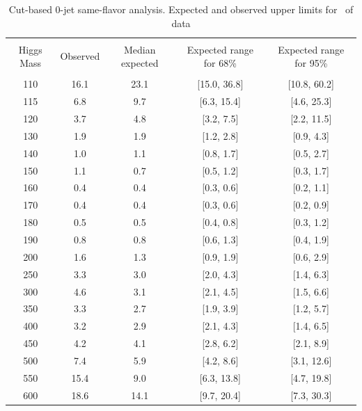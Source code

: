 \begin{table}[!hbp]
\begin{center}
\begin{tabular}{c c c c c}
\hline
\vspace{-3mm} && \\
 Higgs Mass   & Observed & Median expected & Expected range for 68\% & Expected range for 95\%   \\
\vspace{-3mm} && \\
\hline
110 & 16.1 & 23.1 & [15.0, 36.8] & [10.8, 60.2] \\
115 & 6.8 & 9.7 & [6.3, 15.4] & [4.6, 25.3] \\
120 & 3.7 & 4.8 & [3.2, 7.5] & [2.2, 11.5] \\
130 & 1.9 & 1.9 & [1.2, 2.8] & [0.9, 4.3] \\
140 & 1.0 & 1.1 & [0.8, 1.7] & [0.5, 2.7] \\
150 & 1.1 & 0.7 & [0.5, 1.2] & [0.3, 1.7] \\
160 & 0.4 & 0.4 & [0.3, 0.6] & [0.2, 1.1] \\
170 & 0.4 & 0.4 & [0.3, 0.6] & [0.2, 0.9] \\
180 & 0.5 & 0.5 & [0.4, 0.8] & [0.3, 1.2] \\
190 & 0.8 & 0.8 & [0.6, 1.3] & [0.4, 1.9] \\
200 & 1.6 & 1.3 & [0.9, 1.9] & [0.6, 2.9] \\
250 & 3.3 & 3.0 & [2.0, 4.3] & [1.4, 6.3] \\
300 & 4.6 & 3.1 & [2.1, 4.5] & [1.5, 6.6] \\
350 & 3.3 & 2.7 & [1.9, 3.9] & [1.2, 5.7] \\
400 & 3.2 & 2.9 & [2.1, 4.3] & [1.4, 6.5] \\
450 & 4.2 & 4.1 & [2.8, 6.2] & [2.1, 8.9] \\
500 & 7.4 & 5.9 & [4.2, 8.6] & [3.1, 12.6] \\
550 & 15.4 & 9.0 & [6.3, 13.8] & [4.7, 19.8] \\
600 & 18.6 & 14.1 & [9.7, 20.4] & [7.3, 30.3] \\
\hline
\end{tabular}
\caption{Cut-based 0-jet same-flavor analysis. Expected and observed
  upper limits for \intlumi\ of data}
\label{tab:sf0_cut}
\end{center}
\end{table}


